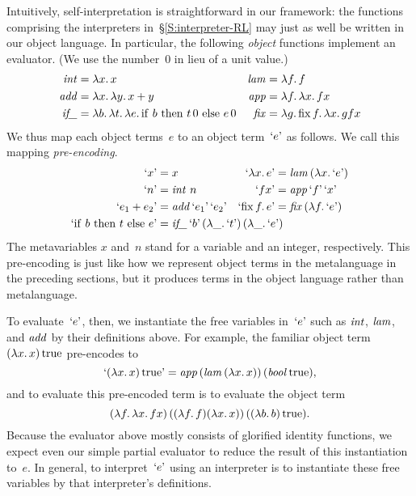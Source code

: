 \documentclass[preprint]{sigplanconf}
\newcommand{\fun}[1]{\mathopen{\lambda\mathord{#1}.\,}}
\newcommand{\fix}[1]{\mathopen{\mathrm{fix\,}\mathord{#1}.\,}}
\newcommand{\cond}[3]{\mathrm{if\ }#1\mathrm{\ then\ }#2\mathrm{\ else\ }#3}
\newcommand{\True}{\mathinner{\mathrm{true}}}
\newcommand{\encode}[1]{\mathinner{\mathopen{\text{`}}#1\mathclose{\text{'}}}}
\newcommand{\ident}[1]{\mathinner{\text{\textit{#1\/}}}}
\begin{document}
Intuitively, self\hyp interpretation is straightforward in our
framework: the functions comprising the interpreters
in~\S\ref{S:interpreter-RL} may just as well be written in our object
language.  In particular, the following \emph{object} functions implement an
evaluator.  (We use the number~$0$ in lieu of a unit value.)
\begin{align*}
    \ident{int} &= \fun{x} x &
    \ident{lam} &= \fun{f} f \\
    \ident{add} &= \fun{x} \fun{y} x+y &
    \ident{app} &= \fun{f} \fun{x} fx \\
    \ident{if\_}&= \fun{b} \fun{t} \fun{e} \cond{b}{t\,0}{e\,0} &
    \ident{fix} &= \fun{g} \fix{f} \fun{x} gfx
\end{align*}
We thus map each object terms~$e$ to an object term~$\encode{e}$ as follows.
We call this mapping \emph{pre-encoding}.
\begin{align*}
    \encode{x} &= x &
    \encode{\fun{x}e} &= \ident{lam} (\fun{x} \encode{e}) \\
    \encode{n} &= \ident{int}\, n &
    \encode{fx} &= \ident{app} \encode{f} \encode{x} \\
    \encode{e_1 + e_2} &= \ident{add} \encode{e_1} \encode{e_2} &
    \encode{\fix{f}e} &= \ident{fix} (\fun{f} \encode{e}) \\
    \encode{\cond{b}{t}{e}} &= \rlap{$\ident{if\_} \encode{b}
        \left(\fun{\_}\encode{t}\right) \left(\fun{\_}\encode{e}\right)$}
\end{align*}
The metavariables $x$ and~$n$ stand for a variable and an integer,
respectively.
This pre-encoding is just like how we represent object terms in the
metalanguage in the preceding sections, but it produces
terms in the object language rather than metalanguage.

To evaluate~$\encode{e}$, then, we
instantiate the free variables in~$\encode{e}$ such as $\ident{int}$,
$\ident{lam}$, and $\ident{add}$ by their definitions above.  For
example, the familiar object term $(\fun{x}x)\True$ pre-encodes to
\begin{equation*}
    \encode{(\fun{x}x)\True} = \ident{app}
    (\ident{lam} (\fun{x} x))\, (\ident{bool} \True),
\end{equation*}
and to evaluate this pre-encoded term is to evaluate the object term
\begin{equation*}
    (\fun{f} \fun{x} fx) \,
    ((\fun{f} f) (\fun{x} x))\, ((\fun{b} b) \True).
\end{equation*}
Because the evaluator above mostly consists of glorified identity
functions, we expect even our simple partial evaluator to reduce the
result of this instantiation to~$e$.  In general, to
interpret~$\encode{e}$ using an interpreter is to instantiate these free
variables by that interpreter's definitions.
\end{document}
